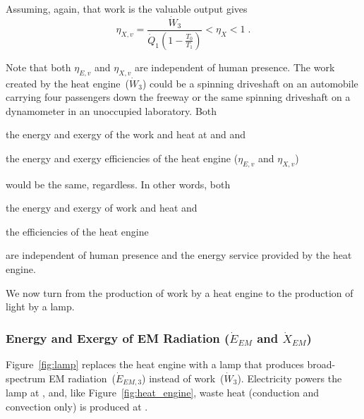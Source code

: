 \documentclass[energies,article,accept,moreauthors,pdftex]{Definitions/mdpi}\usepackage[]{graphicx}\usepackage[]{color}
\newcommand{\enaex}{energy and exergy}
\begin{document}
Assuming, again, that work is the valuable output gives
\begin{equation} \label{eq:valuable_exergy_efficiency}
  \eta_{X,v} = \frac{\dot{W}_3}{\dot{Q}_1 \left( 1 - \frac{T_0}{T_1} \right) } < \eta_X < 1\; .
\end{equation}

Note that both $\eta_{E,v}$ and $\eta_{X,v}$ 
are independent of human presence.
The work created by the heat engine~($\dot{W}_3$) could be 
a spinning driveshaft on an automobile carrying four passengers down the freeway or
the same spinning driveshaft on a dynamometer in an unoccupied laboratory.
Both
%
\begin{enumerate*}[label={(\alph*)}]

  \item the \enaex{} of the work and heat at  and  and

  \item the \enaex{} efficiencies of the heat engine ($\eta_{E,v}$ and $\eta_{X,v}$)

\end{enumerate*}
%
would be the same, regardless.
In other words, both 
%
\begin{enumerate*}[label={(\alph*)}]

  \item the \enaex{} of work and heat and

  \item the efficiencies of the heat engine

\end{enumerate*}
%
are independent of human presence and the energy service provided by the heat engine.

We now turn 
from the production of work by a heat engine
to the production of light by a lamp.


\subsubsection{Energy and Exergy of EM Radiation ($\dot{E}_{EM}$ and $\dot{X}_{EM}$)} 
\label{sec:energy_and_exergy_of_EM_rad}

Figure~\ref{fig:lamp} replaces the heat engine with a lamp 
that produces broad-spectrum EM radiation~($\dot{E}_{EM,3}$)
instead of work~($\dot{W}_3$).
Electricity powers the lamp at , and,
like Figure~\ref{fig:heat_engine},
waste heat (conduction and convection only) is produced at .
\end{document}
